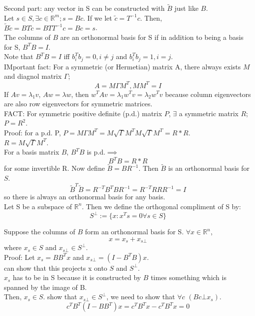 \documentclass{article}
\begin{document}
Second part: any vector in S can be constructed with $\tilde{B}$ just like $B$.\\
Let $s\in S, \exists c\in\mathbb{R}^m; s=Bc$. If we let $\tilde{c}=T^{-1}c$. Then, $\tilde{B}\tilde{c}=BT\tilde{c}=BTT^{-1}c=Bc=s$.\\

The columns of $B$ are an orthonormal basis for S if in addition to being a basis for S, $B^TB=I$.\\
Note that $B^TB=I$ iff $b_i^Tb_j=0, i\neq j$ and $b_i^Tb_j=1, i=j$.\\

IMportant fact: For a symmetric (or Hermetian) matrix A, there always exists $M$ and diagnol matrix $\Gamma$;
\[A=M\Gamma M^T, MM^T=I\]
If $Av=\lambda_1v$, $Aw=\lambda w$, then $w^TAv=\lambda_1w^Tv=\lambda_2w^Tv$ because column eigenvectors are also row eigenvectors for symmetric matrices.\\

FACT: For symmetric positive definite (p.d.) matrix $P$, $\exists$ a symmetric matrix $R$; $P=R^2$.\\
Proof: for a p.d. P, $P=M\Gamma M^T=M\sqrt{\Gamma}M^TM\sqrt{\Gamma}M^T=R*R$.\\
$R=M\sqrt{\Gamma}M^T$.\\
For a basis matrix $B$, $B^TB$ is p.d.$\implies$\\
\[B^TB=R*R\]
for some invertible R. Now define $\tilde{B}=BR^{-1}$. Then $\tilde{B}$ is an orthonormal basis for $S$.\\
\[\tilde{B}^T\tilde{B}=R^{-T}B^TBR^{-1}=R^{-T}RRR^{-1}=I\]
so there is always an orthonormal basis for any basis.\\
Let S be a subspace of $\mathbb{R}^n$. Then we define the orthogonal compliment of S by:
\[S^{\bot}:=\{x:x^Ts=0\forall s\in S\}\]

Suppose the columns of $B$ form an orthonormal basis for S. $\forall x\in \mathbb{R}^n$,\\
\[x=x_s+x_{s\bot}\]
where $x_s\in S$ and $x_{s\bot}\in S^{\bot}$.\\
Proof: Let $x_s=BB^Tx$ and $x_{s\bot}=(I-B^TB)x$.\\
can show that this projects x onto $S$ and $S^\bot$.\\
$x_s$ has to be in S because it is constructed by $B$ times something which is spanned by the image of B.\\
Then, $x_s\in S$. show that $x_{s\bot}\in S^{\bot}$, we need to show that $\forall c$ $(Bc\bot x_s)$.\\
\[c^TB^T(I-BB^T)x=c^TB^Tx-c^TB^Tx=0\]
\end{document}
